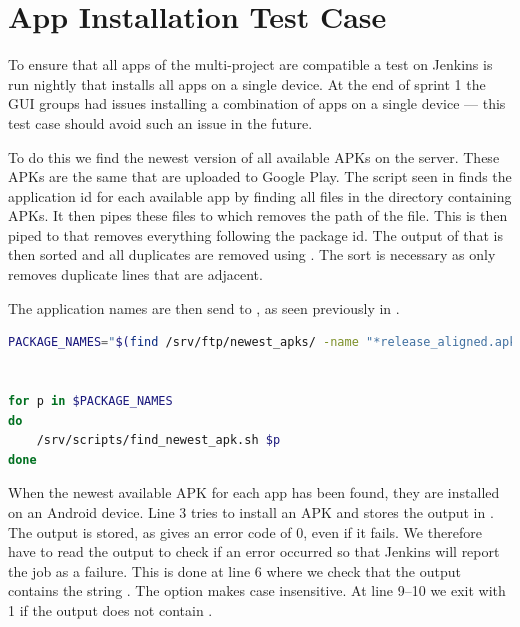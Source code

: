 \section{App Installation Test Case}\label{sec:s3_appinstallationtest}
To ensure that all apps of the multi-project are compatible a test on Jenkins is run nightly that installs all apps on a single device. At the end of sprint 1 the GUI groups had issues installing a combination of apps on a single device --- this test case should avoid such an issue in the future.

To do this we find the newest version of all available APKs on the server. These APKs are the same that are uploaded to Google Play. The script seen in  finds the application id for each available app by finding all files in the directory containing APKs. It then pipes these files to  which removes the path of the file. This is then piped to  that removes everything following the package id. The output of that is then sorted and all duplicates are removed using . The sort is necessary as  only removes duplicate lines that are adjacent. 

The application names are then send to , as seen previously in .

\begin{lstlisting}[language=bash,showstringspaces=false,caption=Script that finds the newest available APK for all apps,label=lst:find_all_newest_apks]
PACKAGE_NAMES="$(find /srv/ftp/newest_apks/ -name "*release_aligned.apk" | sed 's|.*/||' | sed 's|_v.*||' | sort | uniq)"


for p in $PACKAGE_NAMES
do
    /srv/scripts/find_newest_apk.sh $p
done
\end{lstlisting}

When the newest available APK for each app has been found, they are installed on an Android device. Line 3 tries to install an APK and stores the output in . The output is stored, as  gives an error code of 0, even if it fails. We therefore have to read the output to check if an error occurred so that Jenkins will report the job as a failure. This is done at line 6 where we check that the output contains the string . The  option makes  case insensitive. At line 9--10 we exit with 1 if the output does not contain .

